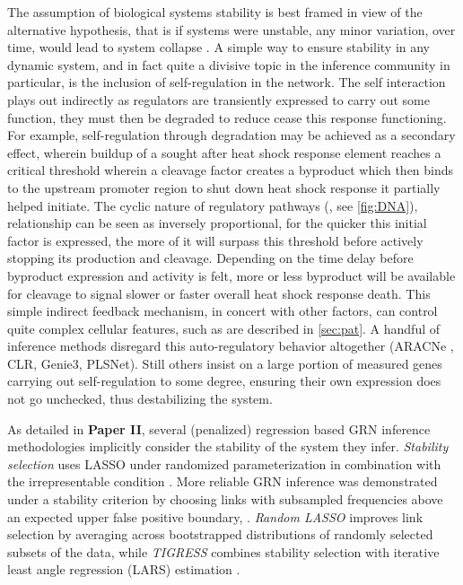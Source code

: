 The assumption of biological systems stability is best framed in view of the alternative hypothesis, that is if systems were unstable, any minor variation, over time, would lead to system collapse \citep{khalil1996adaptive}. A simple way to ensure stability in any dynamic system, and in fact quite a divisive topic in the inference community in particular, is the inclusion of self-regulation in the network. The self interaction plays out indirectly as regulators are transiently expressed to carry out some function, they must then be degraded to reduce cease this response functioning. For example, self-regulation through degradation may be achieved as a secondary effect, wherein buildup of a sought after heat shock response element reaches a critical threshold wherein a cleavage factor creates a byproduct which then binds to the upstream promoter region to shut down heat shock response it partially helped initiate. The cyclic nature of regulatory pathways (\cite{yi2000robust}, see \cref{fig:DNA}), relationship can be seen as inversely proportional, for the quicker this initial factor is expressed, the more of it will surpass this threshold before actively stopping its production and cleavage. Depending on the time delay before byproduct expression and activity is felt, more or less byproduct will be available for cleavage to signal slower or faster overall heat shock response death. This simple indirect feedback mechanism, in concert with other factors, can control quite complex cellular features, such as are described in \cref{sec:pat}. A handful of inference methods disregard this auto-regulatory behavior altogether (ARACNe \citep{montes2014aracne}, CLR\citep{faith2007large}, Genie3\citep{GENIE3}, PLSNet\citep{ham1996partial}). Still others insist on a large portion of measured genes carrying out self-regulation to some degree, ensuring their own expression does not go unchecked, thus destabilizing the system.

As detailed in \textbf{Paper II}, several (penalized) regression based GRN inference methodologies implicitly consider the stability of the system they infer. \textit{Stability selection} uses LASSO under randomized parameterization \citep{tibshirani1996regression} in combination with the irrepresentable condition \citep{zhao2006model}. More reliable GRN inference was demonstrated under a stability criterion by choosing links with subsampled frequencies above an expected upper false positive boundary,  \citep{meinshausen2010stability}.  \textit{Random LASSO} \citep{wang2011random} improves link selection by averaging across bootstrapped distributions of randomly selected subsets of the data, while \textit{TIGRESS} combines stability selection with iterative least angle regression (LARS) estimation \citep{haury2012tigress}.

